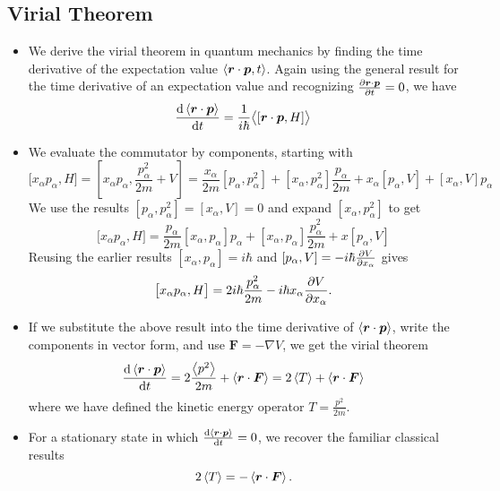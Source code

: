 \documentclass[11pt, a4paper]{article}
\renewcommand{\grad}{\nabla}
\renewcommand{\vec}[1]{\bm{#1}} %
\renewcommand{\r}{\vec{r}}  %
\newcommand{\evb}[1]{\big \langle {#1} \big \rangle}  %
\begin{document}
\subsection{Virial Theorem}
\begin{itemize}
	\item We derive the virial theorem in quantum mechanics by finding the time derivative of the expectation value $ \ev{\r \cdot \vec{p}, t} $. Again using the general result for the time derivative of an expectation value and recognizing $ \pdv{\r \cdot \vec{p}}{t} = 0 $, we have
	\begin{equation*}
		\dv{\ev{\r \cdot \vec{p}}}{t} = \frac{1}{i \hbar} \evb{[\r \cdot \vec{p}, H]}
	\end{equation*}
 	
 	\item We evaluate the commutator by components, starting with
 	\begin{equation*}
 		\big[ x_{\alpha} p_{\alpha}, H\big] = \left[x_{\alpha}p_{\alpha}, \frac{p_{\alpha}^{2}}{2m} + V\right] = \frac{x_{\alpha}}{2m} [p_{\alpha}, p_{\alpha}^{2}] + [x_{\alpha}, p_{\alpha}^{2}]\frac{p_{\alpha}}{2m} + x_{\alpha}[p_{\alpha}, V] + [x_{\alpha}, V]p_{\alpha}
 	\end{equation*}
 	We use the results $ [p_{\alpha}, p_{\alpha}^{2}] = [x_{\alpha}, V] = 0 $ and expand $ [x_{\alpha}, p_{\alpha}^{2}] $ to get
 	\begin{equation*}
 		\big[ x_{\alpha} p_{\alpha}, H\big] = \frac{p_{\alpha}}{2m}[x_{\alpha}, p_{\alpha}]p_{\alpha} + [x_{\alpha}, p_{\alpha}]\frac{p_{\alpha}^{2}}{2m} + x[p_{\alpha}, V]
 	\end{equation*}
 	Reusing the earlier results $ [x_{\alpha}, p_{\alpha}] = i \hbar $ and $ [p_{\alpha}, V] = - i \hbar \pdv{V}{x_{\alpha}} $ gives
 	\begin{equation*}
 		\big[ x_{\alpha} p_{\alpha}, H\big] = 2i \hbar \frac{p_{\alpha}^{2}}{2m} - i \hbar x_{\alpha} \pdv{V}{x_{\alpha}}.
 	\end{equation*}
 	
 	\item If we substitute the above result into the time derivative of $ \ev{\r \cdot \vec{p}} $, write the components in vector form, and use $ \vec{F} = - \grad V $, we get the virial theorem
 	\begin{equation*}
 		\dv{\ev{\r \cdot \vec{p}}}{t} = 2\frac{\ev{p^{2}}}{2m} + \ev{\r \cdot \vec{F}} = 2 \ev{T} + \ev{\r \cdot \vec{F}}
 	\end{equation*}
 	where we have defined the kinetic energy operator $ T = \frac{p^{2}}{2m} $.
 	
 	\item For a stationary state in which $ \dv{\ev{\r \cdot \vec{p}}}{t} = 0 $, we recover the familiar classical results
 	\begin{equation*}
 		2\ev{T} = - \ev{\r \cdot \vec{F}}.
 	\end{equation*}
\end{itemize}
\end{document}
